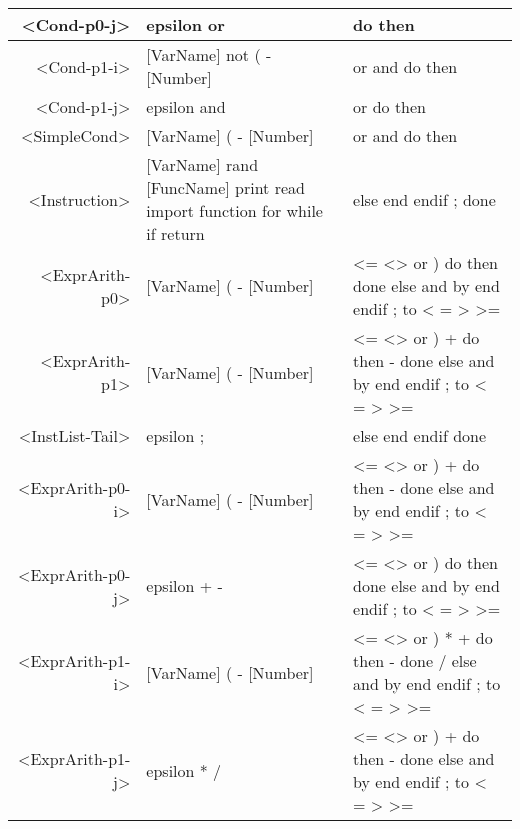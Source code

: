 \begin{longtable}{r p{7cm} p{7cm}}
<Cond-p0-j> & epsilon or  & do then \\ \hline
<Cond-p1-i> & [VarName] not ( - [Number]  & or and do then \\ \hline
<Cond-p1-j> & epsilon and  & or do then \\ \hline
<SimpleCond> & [VarName] ( - [Number]  & or and do then \\ \hline
<Instruction> & [VarName] rand [FuncName] print read import function for while if return  & else end endif ; done \\ \hline
<ExprArith-p0> & [VarName] ( - [Number]  & <= <> or ) do then done else and by end endif ; to < = > >= \\ \hline
<ExprArith-p1> & [VarName] ( - [Number]  & <= <> or ) + do then - done else and by end endif ; to < = > >= \\ \hline
<InstList-Tail> & epsilon ;  & else end endif done \\ \hline
<ExprArith-p0-i> & [VarName] ( - [Number]  & <= <> or ) + do then - done else and by end endif ; to < = > >= \\ \hline
<ExprArith-p0-j> & epsilon + -  & <= <> or ) do then done else and by end endif ; to < = > >= \\ \hline
<ExprArith-p1-i> & [VarName] ( - [Number]  & <= <> or ) * + do then - done / else and by end endif ; to < = > >= \\ \hline
<ExprArith-p1-j> & epsilon * /  & <= <> or ) + do then - done else and by end endif ; to < = > >= 
\end{longtable}

